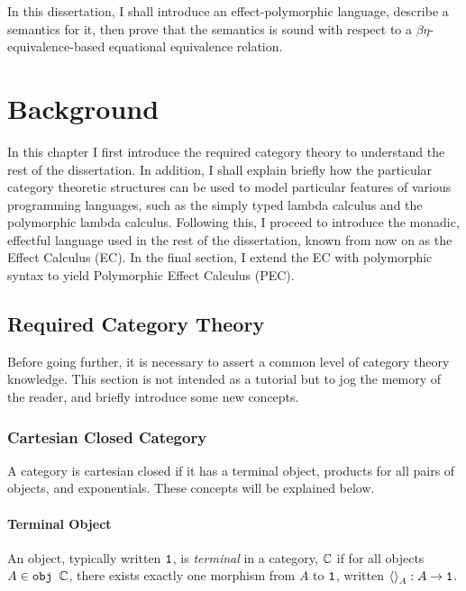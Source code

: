 \documentclass{Report}
\begin{document}
In this dissertation, I shall introduce an effect-polymorphic language, describe a semantics for it, then prove that the semantics is sound with respect to a $\beta\eta$-equivalence-based equational equivalence relation.

\chapter{Background}



In this chapter I first introduce the required category theory to understand the rest of the dissertation. In addition, I shall explain briefly how the particular category theoretic structures can be used to model particular features of various programming languages, such as the simply typed lambda calculus and the polymorphic lambda calculus. Following this, I proceed to introduce the monadic, effectful language used in the rest of the dissertation, known from now on as the Effect Calculus (EC). In the final section, I extend the EC with polymorphic syntax to yield Polymorphic Effect Calculus (PEC).

\section{Required Category Theory}\label{CategoryTheoryRequirements}




Before going further, it is necessary to assert a common level of category theory knowledge. This section is not intended as a tutorial but to jog the memory of the reader, and briefly introduce some new concepts.

\subsection{Cartesian Closed Category}\label{CCC}
A category is cartesian closed if it has a terminal object, products for all pairs of objects, and exponentials. These concepts will be explained below.

\subsubsection{Terminal Object}
An object, typically written $\texttt{1}$, is \textit{terminal} in a category, $\mathbb{C}$ if for all objects $A\in\texttt{obj }\mathbb{C}$, there exists exactly one morphism from $A$ to $\texttt{1}$, written $\left\langle\right\rangle_{A}: A \rightarrow \texttt{1}$.
\end{document}

